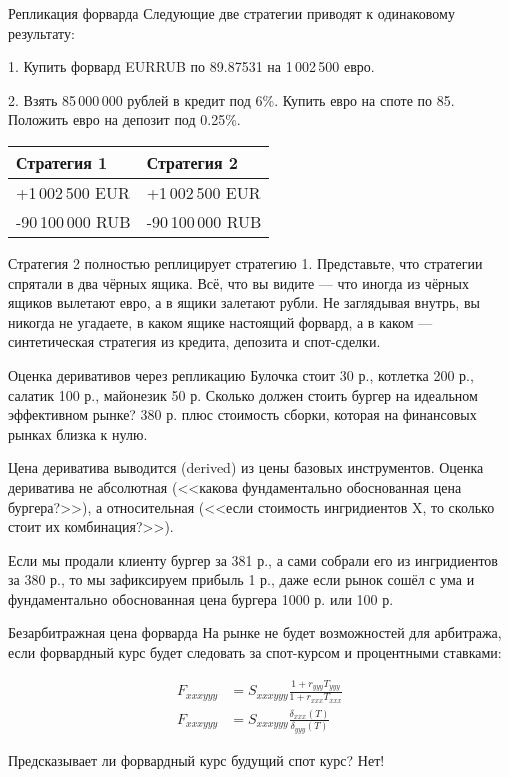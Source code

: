 \documentclass{beamer}
\begin{document}
\begin{frame}{Репликация форварда}
\justify
Следующие две стратегии приводят к одинаковому результату:

1. Купить форвард EURRUB по 89.87531 на 1\,002\,500 евро.

2. Взять 85\,000\,000 рублей в кредит под 6\%. Купить евро на споте по 85. Положить евро на депозит под 0.25\%.

\justify
\centering
\begin{tabular}{l|l}
Стратегия 1       & Стратегия 2 \\ \hline
+1\,002\,500 EUR  & +1\,002\,500 EUR \\
-90\,100\,000 RUB & -90\,100\,000 RUB
\end{tabular}

\justify
Стратегия 2 полностью \alert{реплицирует} стратегию 1. Представьте, что стратегии спрятали в два чёрных ящика. Всё, что вы видите --- что иногда из чёрных ящиков вылетают евро, а в ящики залетают рубли. Не заглядывая внутрь, вы никогда не угадаете, в каком ящике настоящий форвард, а в каком --- синтетическая стратегия из кредита, депозита и спот-сделки.
\end{frame}



\begin{frame}{Оценка деривативов через репликацию}
\justify
Булочка стоит 30 р., котлетка 200 р., салатик 100 р., майонезик 50 р. Сколько должен стоить бургер на идеальном эффективном рынке? 380 р. плюс стоимость сборки, которая на финансовых рынках близка к нулю.

\justify
Цена дериватива выводится (derived) из цены базовых инструментов. Оценка дериватива
не абсолютная (<<какова фундаментально обоснованная цена бургера?>>), а относительная (<<если стоимость ингридиентов X, то сколько стоит их комбинация?>>).

\justify
Если мы продали клиенту бургер за 381 р., а сами собрали его из ингридиентов за 380 р., то мы зафиксируем прибыль 1 р., даже если рынок сошёл с ума и фундаментально обоснованная цена бургера 1000 р. или 100 р.
\end{frame}



\begin{frame}{Безарбитражная цена форварда}
\justify
На рынке не будет возможностей для арбитража, если форвардный курс будет следовать за спот-курсом и процентными ставками:

\begin{align*}
F_{xxxyyy} &= S_{xxxyyy} \frac{1 + r_{yyy}T_{yyy}}{1 + r_{xxx}T_{xxx}} \\
F_{xxxyyy} &= S_{xxxyyy} \frac{\delta_{xxx}(T)}{\delta_{yyy}(T)}
\end{align*}

\justify
Предсказывает ли форвардный курс будущий спот курс? Нет!
\end{frame}
\end{document}
